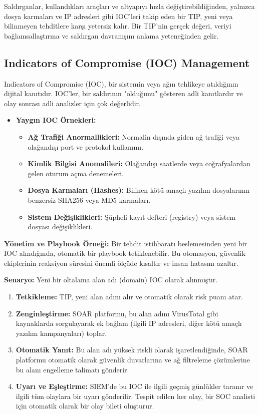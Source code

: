 Saldırganlar, kullandıkları araçları ve altyapıyı hızla değiştirebildiğinden, yalnızca dosya karmaları ve IP adresleri gibi IOC'leri takip eden bir TIP, yeni veya bilinmeyen tehditlere karşı yetersiz kalır. Bir TIP'nin gerçek değeri, veriyi bağlamsallaştırma ve saldırgan davranışını anlama yeteneğinden gelir.

\subsection{Indicators of Compromise (IOC) Management}

Indicators of Compromise (IOC), bir sistemin veya ağın tehlikeye atıldığının dijital kanıtıdır. IOC'ler, bir saldırının "olduğunu" gösteren adli kanıtlardır ve olay sonrası adli analizler için çok değerlidir.

\begin{itemize}
    \item \textbf{Yaygın IOC Örnekleri:}
    \begin{itemize}
        \item \textbf{Ağ Trafiği Anormallikleri:} Normalin dışında giden ağ trafiği veya olağandışı port ve protokol kullanımı.
        \item \textbf{Kimlik Bilgisi Anomalileri:} Olağandışı saatlerde veya coğrafyalardan gelen oturum açma denemeleri.
        \item \textbf{Dosya Karmaları (Hashes):} Bilinen kötü amaçlı yazılım dosyalarının benzersiz SHA256 veya MD5 karmaları.
        \item \textbf{Sistem Değişiklikleri:} Şüpheli kayıt defteri (registry) veya sistem dosyası değişiklikleri.
    \end{itemize}
\end{itemize}

\textbf{Yönetim ve Playbook Örneği:}
Bir tehdit istihbaratı beslemesinden yeni bir IOC alındığında, otomatik bir playbook tetiklenebilir. Bu otomasyon, güvenlik ekiplerinin reaksiyon süresini önemli ölçüde kısaltır ve insan hatasını azaltır.

\textbf{Senaryo:} Yeni bir oltalama alan adı (domain) IOC olarak alınmıştır.

\begin{enumerate}
    \item \textbf{Tetkikleme:} TIP, yeni alan adını alır ve otomatik olarak risk puanı atar.
    \item \textbf{Zenginleştirme:} SOAR platformu, bu alan adını VirusTotal gibi kaynaklarda sorgulayarak ek bağlam (ilgili IP adresleri, diğer kötü amaçlı yazılım kampanyaları) toplar.
    \item \textbf{Otomatik Yanıt:} Bu alan adı yüksek riskli olarak işaretlendiğinde, SOAR platformu otomatik olarak güvenlik duvarlarına ve ağ filtreleme çözümlerine bu alanı engelleme talimatı gönderir.
    \item \textbf{Uyarı ve Eşleştirme:} SIEM'de bu IOC ile ilgili geçmiş günlükler taranır ve ilgili tüm olaylara bir uyarı gönderilir. Tespit edilen her olay, bir SOC analisti için otomatik olarak bir olay bileti oluşturur.
\end{enumerate}

